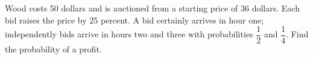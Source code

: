Wood costs 50 dollars and is auctioned from a starting price of 36 dollars. Each bid raises the price by 25 percent. A bid certainly arrives in hour one; independently bids arrive in hours two and three with probabilities $\dfrac{1}{2}$ and $\dfrac{1}{4}$. Find the probability of a profit.
